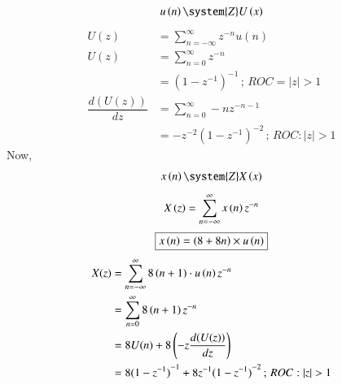 \documentclass[journal,12pt,twocolumn]{IEEEtran}
\theoremstyle{remark}
\begin{document}
\begin{align}
    u\brak{n} \system{Z} U\brak{x}
\end{align}
\begin{align}
    U(z) &= \sum\limits_{n=-\infty}^{\infty}z^{-n}u(n)  \\
    U(z) &= \sum\limits_{n=0}^{\infty}z^{-n}   \\
    &= {(1-{z}^{-1})}^{-1} \, ;\, ROC=|z|>1  \\
    \dfrac{d(U(z))}{dz} &= \sum\limits_{n=0}^{\infty}-nz^{-n-1}   \\
    &=-{z}^{-2} {(1-{z^{-1}})}^{-2} \, ; \, ROC:|z|>1
\end{align}
Now,
\begin{align}
    x\brak{n} \system{Z} X\brak{x}
\end{align}
\begin{align}
    X\left(z\right) &= \sum\limits_{n=-\infty}^{\infty}x\left(n\right) z^{-n}   \\
\end{align}
\begin{align}
   \boxed{ x\left(n\right)=\left(8+8n\right) \times u\left(n\right) } 
\end{align}
\begin{align}
    X(z )&= \sum\limits_{n=-\infty}^{\infty} 8\brak{n+1} \cdot u\brak{n} z^{-n}  \\
    &= \sum\limits_{n=0}^{\infty} 8\brak{n+1} z^{-n}    \\
    &= 8U(n)+8\left (-z\dfrac{d(U(z))}{dz}\right )   \\
    &= 8{(1-{z}^{-1})}^{-1}+8{z}^{-1} {(1-{z^{-1}})}^{-2} \, ; \, ROC:|z|>1 
\end{align}

\end{document}
